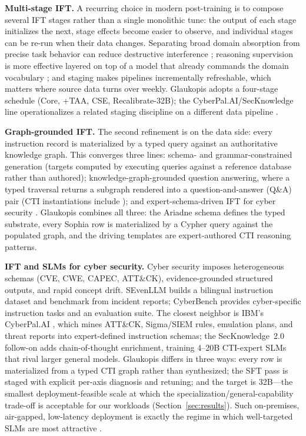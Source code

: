 \documentclass[conference]{IEEEtran}
\begin{document}
\textbf{Multi-stage IFT.} A recurring choice in modern post-training is to compose several IFT stages rather than a single monolithic tune: the output of each stage initializes the next, stage effects become easier to observe, and individual stages can be re-run when their data changes. Separating broad domain absorption from precise task behavior can reduce destructive interference \cite{gururangan2020dontstop,ouyang2022instructgpt}; reasoning supervision is more effective layered on top of a model that already commands the domain vocabulary \cite{wei2022cot,levi2025toward}; and staging makes pipelines incrementally refreshable, which matters where source data turns over weekly. Glaukopis adopts a four-stage schedule (Core, +TAA, CSE, Recalibrate-32B); the CyberPal.AI/SecKnowledge line operationalizes a related staging discipline on a different data pipeline \cite{levi2024cyberpal,levi2025toward}.

\textbf{Graph-grounded IFT.} The second refinement is on the data side: every instruction record is materialized by a typed query against an authoritative knowledge graph. This converges three lines: schema- and grammar-constrained generation (targets computed by executing queries against a reference database rather than authored); knowledge-graph-grounded question answering, where a typed traversal returns a subgraph rendered into a question-and-answer (Q\&A) pair (CTI instantiations include \cite{fieblinger2024kg,wu2022opencykg,yu2024ctikg,zhao2024kctiaa,zhang2023cyberkg}); and expert-schema-driven IFT for cyber security \cite{levi2024cyberpal,levi2025toward}. Glaukopis combines all three: the Ariadne schema defines the typed substrate, every Sophia row is materialized by a Cypher query against the populated graph, and the driving templates are expert-authored CTI reasoning patterns.

\textbf{IFT and SLMs for cyber security.} Cyber security imposes heterogeneous schemas (CVE, CWE, CAPEC, ATT\&CK), evidence-grounded structured outputs, and rapid concept drift. SEvenLLM \cite{ji2024sevenllm} builds a bilingual instruction dataset and benchmark from incident reports; CyberBench \cite{liu2024cyberbench} provides cyber-specific instruction tasks and an evaluation suite. The closest neighbor is IBM's CyberPal.AI \cite{levi2024cyberpal}, which mines ATT\&CK, Sigma/SIEM rules, emulation plans, and threat reports into expert-defined instruction schemas; the SecKnowledge~2.0 follow-on \cite{levi2025toward} adds chain-of-thought enrichment, training 4--20B CTI-expert SLMs that rival larger general models. Glaukopis differs in three ways: every row is materialized from a typed CTI graph rather than synthesized; the SFT pass is staged with explicit per-axis diagnosis and retuning; and the target is 32B---the smallest deployment-feasible scale at which the specialization/general-capability trade-off is acceptable for our workloads (Section~\ref{sec:results}). Such on-premises, air-gapped, low-latency deployment is exactly the regime in which well-targeted SLMs are most attractive \cite{levi2025toward}.
\end{document}
